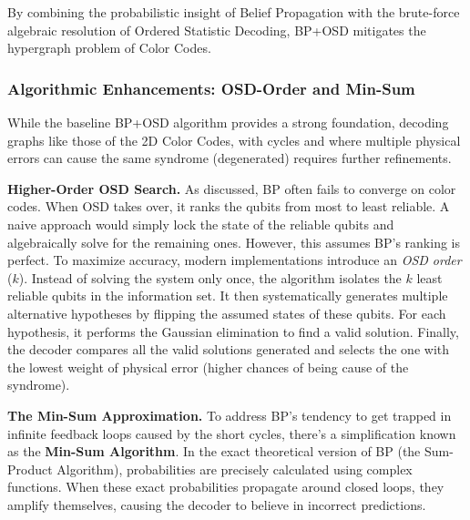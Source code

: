 By combining the probabilistic insight of Belief Propagation with the brute-force algebraic resolution of Ordered Statistic Decoding, BP+OSD mitigates the hypergraph problem of Color Codes.


\subsubsection*{Algorithmic Enhancements: OSD-Order and Min-Sum}

While the baseline BP+OSD algorithm provides a strong foundation, decoding graphs like those of the 2D Color Codes, with cycles and where multiple physical errors can cause the same syndrome (degenerated) requires further refinements.

 \textbf{Higher-Order OSD Search.} As discussed, BP often fails to converge on color codes. When OSD takes over, it ranks the qubits from most to least reliable. A naive approach would simply lock the state of the reliable qubits and algebraically solve for the remaining ones. However, this assumes BP's ranking is perfect. To maximize accuracy, modern implementations introduce an \textit{OSD order} ($k$). Instead of solving the system only once, the algorithm isolates the $k$ least reliable qubits in the information set. It then systematically generates multiple alternative hypotheses by flipping the assumed states of these qubits. For each hypothesis, it performs the Gaussian elimination to find a valid solution. Finally, the decoder compares all the valid solutions generated and selects the one with the lowest weight of physical error (higher chances of being cause of the syndrome). 

\textbf{The Min-Sum Approximation.} To address BP's tendency to get trapped in infinite feedback loops caused by the short cycles, there's a simplification known as the \textbf{Min-Sum Algorithm}. In the exact theoretical version of BP (the Sum-Product Algorithm), probabilities are precisely calculated using complex functions. When these exact probabilities propagate around closed loops, they amplify themselves, causing the decoder to believe in incorrect predictions. 


